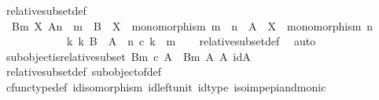 \begin{isabellebody}
\ relative{\isacharunderscore}{\kern0pt}subset{\isacharunderscore}{\kern0pt}def{}{\isacharcolon}{\kern0pt}\ \isanewline
\ \ {\isachardoublequoteopen}{\isacharparenleft}{\kern0pt}B{\isacharcomma}{\kern0pt}m{\isacharparenright}{\kern0pt}\ {\isasymsubseteq}\isactrlbsub X\isactrlesub \ {\isacharparenleft}{\kern0pt}A{\isacharcomma}{\kern0pt}n{\isacharparenright}{\kern0pt}\ {\isacharequal}{\kern0pt}\ {\isacharparenleft}{\kern0pt}m\ {\isacharcolon}{\kern0pt}\ B\ {\isasymrightarrow}\ X\ {\isasymand}\ monomorphism\ m\ {\isasymand}\ n\ {\isacharcolon}{\kern0pt}\ A\ {\isasymrightarrow}\ X\ {\isasymand}\ monomorphism\ n\isanewline
\ \ \ \ \ \ \ \ \ \ {\isasymand}\ {\isacharparenleft}{\kern0pt}{\isasymexists}\ k{\isachardot}{\kern0pt}\ k{\isacharcolon}{\kern0pt}\ B\ {\isasymrightarrow}\ A\ {\isasymand}\ n\ {\isasymcirc}\isactrlsub c\ k\ {\isacharequal}{\kern0pt}\ m{\isacharparenright}{\kern0pt}{\isacharparenright}{\kern0pt}{\isachardoublequoteclose}\isanewline
%
\isadelimproof
\ \ %
\endisadelimproof
%
\isatagproof
{}\isamarkupfalse%
\ relative{\isacharunderscore}{\kern0pt}subset{\isacharunderscore}{\kern0pt}def\ \isamarkupfalse%
\ auto%
\endisatagproof
{\isafoldproof}%
%
\isadelimproof
\isanewline
%
\endisadelimproof
\isanewline
{}\isamarkupfalse%
\ subobject{\isacharunderscore}{\kern0pt}is{\isacharunderscore}{\kern0pt}relative{\isacharunderscore}{\kern0pt}subset{\isacharcolon}{\kern0pt}\ {\isachardoublequoteopen}{\isacharparenleft}{\kern0pt}B{\isacharcomma}{\kern0pt}m{\isacharparenright}{\kern0pt}\ {\isasymsubseteq}\isactrlsub c\ A\ {\isasymlongleftrightarrow}\ {\isacharparenleft}{\kern0pt}B{\isacharcomma}{\kern0pt}m{\isacharparenright}{\kern0pt}\ {\isasymsubseteq}\isactrlbsub A\isactrlesub \ {\isacharparenleft}{\kern0pt}A{\isacharcomma}{\kern0pt}\ id{\isacharparenleft}{\kern0pt}A{\isacharparenright}{\kern0pt}{\isacharparenright}{\kern0pt}{\isachardoublequoteclose}\isanewline
%
\isadelimproof
\ \ %
\endisadelimproof
%
\isatagproof
{}\isamarkupfalse%
\ relative{\isacharunderscore}{\kern0pt}subset{\isacharunderscore}{\kern0pt}def{}\ subobject{\isacharunderscore}{\kern0pt}of{\isacharunderscore}{\kern0pt}def{}\isanewline
\ \ \isamarkupfalse%
\ cfunc{\isacharunderscore}{\kern0pt}type{\isacharunderscore}{\kern0pt}def\ id{\isacharunderscore}{\kern0pt}isomorphism\ id{\isacharunderscore}{\kern0pt}left{\isacharunderscore}{\kern0pt}unit\ id{\isacharunderscore}{\kern0pt}type\ iso{\isacharunderscore}{\kern0pt}imp{\isacharunderscore}{\kern0pt}epi{\isacharunderscore}{\kern0pt}and{\isacharunderscore}{\kern0pt}monic\ \isamarkupfalse%

\end{isabellebody}

